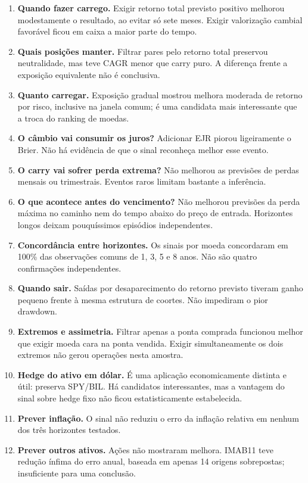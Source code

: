 \documentclass[11pt,a4paper]{article}
\begin{document}
\begin{enumerate}[leftmargin=1.7em,itemsep=8pt]
\item \textbf{Quando fazer carrego.} Exigir retorno total previsto positivo melhorou modestamente o resultado, ao evitar só sete meses. Exigir valorização cambial favorável ficou em caixa a maior parte do tempo.
\item \textbf{Quais posições manter.} Filtrar pares pelo retorno total preservou neutralidade, mas teve CAGR menor que carry puro. A diferença frente a exposição equivalente não é conclusiva.
\item \textbf{Quanto carregar.} Exposição gradual mostrou melhora moderada de retorno por risco, inclusive na janela comum; é uma candidata mais interessante que a troca do ranking de moedas.
\item \textbf{O câmbio vai consumir os juros?} Adicionar EJR piorou ligeiramente o Brier. Não há evidência de que o sinal reconheça melhor esse evento.
\item \textbf{O carry vai sofrer perda extrema?} Não melhorou as previsões de perdas mensais ou trimestrais. Eventos raros limitam bastante a inferência.
\item \textbf{O que acontece antes do vencimento?} Não melhorou previsões da perda máxima no caminho nem do tempo abaixo do preço de entrada. Horizontes longos deixam pouquíssimos episódios independentes.
\item \textbf{Concordância entre horizontes.} Os sinais por moeda concordaram em 100\% das observações comuns de 1, 3, 5 e 8 anos. Não são quatro confirmações independentes.
\item \textbf{Quando sair.} Saídas por desaparecimento do retorno previsto tiveram ganho pequeno frente à mesma estrutura de coortes. Não impediram o pior drawdown.
\item \textbf{Extremos e assimetria.} Filtrar apenas a ponta comprada funcionou melhor que exigir moeda cara na ponta vendida. Exigir simultaneamente os dois extremos não gerou operações nesta amostra.
\item \textbf{Hedge do ativo em dólar.} É uma aplicação economicamente distinta e útil: preserva SPY/BIL. Há candidatos interessantes, mas a vantagem do sinal sobre hedge fixo não ficou estatisticamente estabelecida.
\item \textbf{Prever inflação.} O sinal não reduziu o erro da inflação relativa em nenhum dos três horizontes testados.
\item \textbf{Prever outros ativos.} Ações não mostraram melhora. IMAB11 teve redução ínfima do erro anual, baseada em apenas 14 origens sobrepostas; insuficiente para uma conclusão.
\end{enumerate}
\end{document}

